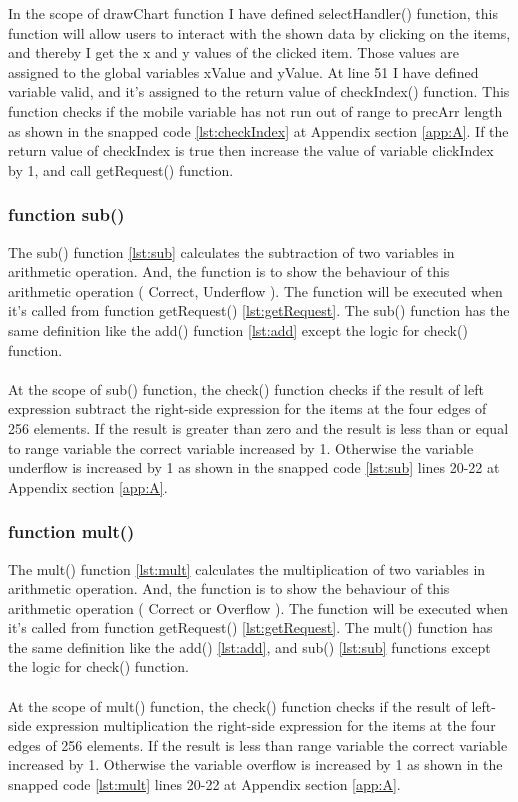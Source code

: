 \documentclass[11pt]{article}
\begin{document}
In the scope of drawChart function I have defined selectHandler() function, this function will allow users to interact with the shown data by clicking on the items, and thereby I get the x and y values of the clicked item. Those values are assigned to the global variables xValue and yValue. At line 51 I have defined variable valid, and it's assigned to the return value of checkIndex() function. This function checks if the mobile variable has not run out of range to precArr length as shown in the snapped code \ref{lst:checkIndex} at Appendix section \ref{app:A}. If the return value of checkIndex is true then increase the value of variable clickIndex by 1, and call getRequest() function.

\subsubsection{function sub()}
The sub() function \ref{lst:sub} calculates the subtraction of two variables in arithmetic operation. And, the function is to show the behaviour of this arithmetic operation ( Correct, Underflow ). The function will be executed when it's called from function getRequest() \ref{lst:getRequest}. The sub() function has the same definition like the add() function \ref{lst:add} except the logic for check() function.\\
\\At the scope of sub() function, the check() function checks if the result of left expression subtract the right-side expression for the items at the four edges of 256 elements. If the result is greater than zero and the result is less than or equal to range variable the correct variable increased by 1. Otherwise the variable underflow is increased by 1 as shown in the snapped code \ref{lst:sub} lines 20-22 at Appendix section \ref{app:A}.\\

\subsubsection{function mult()}
The mult() function \ref{lst:mult} calculates the multiplication of two variables in arithmetic operation. And, the function is to show the behaviour of this arithmetic operation ( Correct or Overflow ). The function will be executed when it's called from function getRequest() \ref{lst:getRequest}. The mult() function has the same definition like the add() \ref{lst:add}, and sub() \ref{lst:sub} functions except the logic for check() function.\\
\\At the scope of mult() function, the check() function checks if the result of left-side expression multiplication the right-side expression for the items at the four edges of 256 elements. If the result is less than range variable the correct variable increased by 1. Otherwise the variable overflow is increased by 1 as shown in the snapped code \ref{lst:mult} lines 20-22 at Appendix section \ref{app:A}.\\
\end{document}
